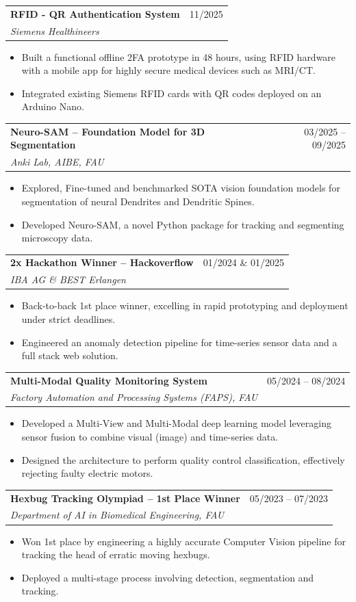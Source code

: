 \documentclass[letterpaper,11pt]{article}
\makeatletter
\newcommand{\resumeSubheading}[4]{
  \vspace{-1pt}\item
    \begin{tabular*}{0.97\textwidth}[t]{l@{\extracolsep{\fill}}r}
      \textbf{#1} & #2 \\
      \textit{\small#3} & \textit{\small #4} \\
    \end{tabular*}\vspace{-5pt}
}
\newcommand{\resumeItemListStart}{\begin{itemize}}
\newcommand{\resumeItemListEnd}{\end{itemize}\vspace{-5pt}}
\makeatother
\begin{document}
  \resumeSubheading
      {RFID - QR Authentication System}{11/2025}
      {Siemens Healthineers}{}
      \resumeItemListStart
        \item Built a functional offline 2FA prototype in 48 hours, using RFID hardware with a mobile app for highly secure medical devices such as MRI/CT.
        \item Integrated existing Siemens RFID cards with QR codes deployed on an Arduino Nano.
      \resumeItemListEnd

  \resumeSubheading
      {Neuro-SAM -- Foundation Model for 3D Segmentation}{03/2025 -- 09/2025}
      {Anki Lab, AIBE, FAU}{}
      \resumeItemListStart
        \item Explored, Fine-tuned and benchmarked SOTA vision foundation models for segmentation of neural Dendrites and Dendritic Spines.
        \item Developed Neuro-SAM, a novel Python package for tracking and segmenting microscopy data.
      \resumeItemListEnd

  \resumeSubheading
      {2x Hackathon Winner -- Hackoverflow}{01/2024 \& 01/2025}
      {IBA AG \& BEST Erlangen}{}
      \resumeItemListStart
        \item Back-to-back 1st place winner, excelling in rapid prototyping and deployment under strict deadlines.
        \item Engineered an anomaly detection pipeline for time-series sensor data and a full stack web solution. 
      \resumeItemListEnd

    \resumeSubheading
      {Multi-Modal Quality Monitoring System}{05/2024 -- 08/2024}
      {Factory Automation and Processing Systems (FAPS), FAU}{}
      \resumeItemListStart
        \item Developed a Multi-View and Multi-Modal deep learning model leveraging sensor fusion to combine visual (image) and time-series data.
        \item Designed the architecture to perform quality control classification, effectively rejecting faulty electric motors.
      \resumeItemListEnd
      
    \resumeSubheading
      {Hexbug Tracking Olympiad -- 1st Place Winner}{05/2023 -- 07/2023}
      {Department of AI in Biomedical Engineering, FAU}{}
      \resumeItemListStart
        \item Won 1st place by engineering a highly accurate Computer Vision pipeline for tracking the head of erratic moving hexbugs.
        \item Deployed a multi-stage process involving detection, segmentation and tracking.
      \resumeItemListEnd
  
\end{document}

